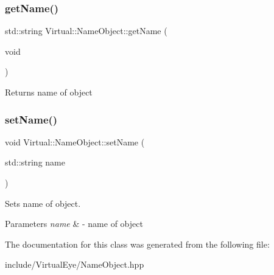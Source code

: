 \subsubsection{\texorpdfstring{get\+Name()}{getName()}}
{\footnotesize\ttfamily std\+::string Virtual\+::\+Name\+Object\+::get\+Name (\begin{DoxyParamCaption}\item[{void}]{ }\end{DoxyParamCaption})\hspace{0.3cm}{\ttfamily [inline]}}

\begin{DoxyReturn}{Returns}
name of object 
\end{DoxyReturn}
\hypertarget{class_virtual_1_1_name_object_a83cf1d1cf7b337169f060a64b6630eff}{}\label{class_virtual_1_1_name_object_a83cf1d1cf7b337169f060a64b6630eff} 
\subsubsection{\texorpdfstring{set\+Name()}{setName()}}
{\footnotesize\ttfamily void Virtual\+::\+Name\+Object\+::set\+Name (\begin{DoxyParamCaption}\item[{std\+::string}]{name }\end{DoxyParamCaption})\hspace{0.3cm}{\ttfamily [inline]}}



Sets name of object. 


\begin{DoxyParams}{Parameters}
{\em name} & -\/ name of object \\
\hline
\end{DoxyParams}


The documentation for this class was generated from the following file\+:\begin{DoxyCompactItemize}
\item 
include/\+Virtual\+Eye/Name\+Object.\+hpp\end{DoxyCompactItemize}
